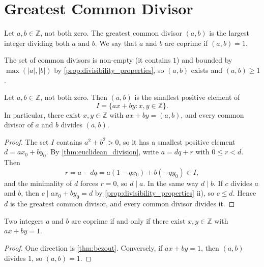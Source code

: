 \section{Greatest Common Divisor}

\begin{definition}\label{def:gcd}
    Let $a,b \in \mathbb{Z}$, not both zero. The greatest common divisor $(a,b)$ is the largest integer dividing both $a$ and $b$. We say that $a$ and $b$ are coprime if $(a,b) = 1$.
\end{definition}
The set of common divisors is non-empty (it contains $1$) and bounded by $\max(|a|,|b|)$ by \cref{prop:divisibility_properties}, so $(a,b)$ exists and $(a,b) \ge 1$.

\begin{theorem}\label{thm:bezout}
    Let $a,b \in \mathbb{Z}$, not both zero. Then $(a,b)$ is the smallest positive element of
    \begin{equation*}
        I = \{ax + by : x,y \in \mathbb{Z}\}.
    \end{equation*}
    In particular, there exist $x,y \in \mathbb{Z}$ with $ax + by = (a,b)$, and every common divisor of $a$ and $b$ divides $(a,b)$.
\end{theorem}
\begin{proof}
    The set $I$ contains $a^2 + b^2 > 0$, so it has a smallest positive element $d = ax_0 + by_0$. By \cref{thm:euclidean_division}, write $a = dq + r$ with $0 \le r < d$. Then
    \begin{equation*}
        r = a - dq = a(1 - qx_0) + b(-qy_0) \in I,
    \end{equation*}
    and the minimality of $d$ forces $r = 0$, so $d \mid a$. In the same way $d \mid b$. If $c$ divides $a$ and $b$, then $c \mid ax_0 + by_0 = d$ by \cref{prop:divisibility_properties} ii), so $c \le d$. Hence $d$ is the greatest common divisor, and every common divisor divides it.
\end{proof}

\begin{corollary}\label{cor:coprime_bezout}
    Two integers $a$ and $b$ are coprime if and only if there exist $x,y \in \mathbb{Z}$ with $ax + by = 1$.
\end{corollary}
\begin{proof}
    One direction is \cref{thm:bezout}. Conversely, if $ax + by = 1$, then $(a,b)$ divides $1$, so $(a,b) = 1$.
\end{proof}

